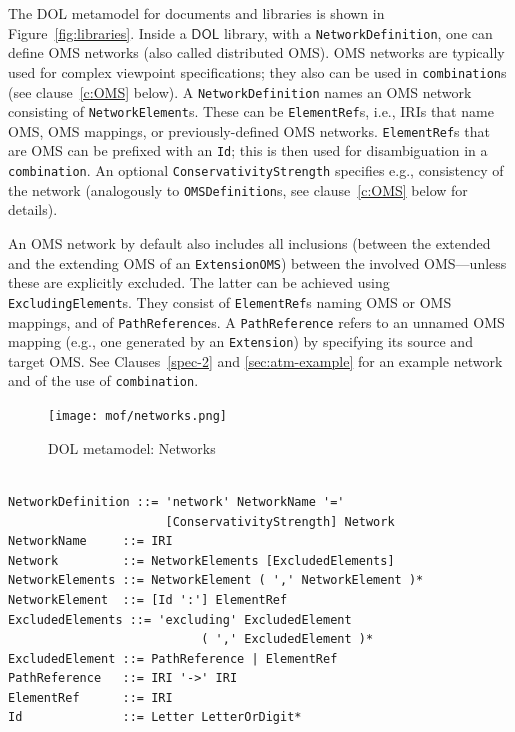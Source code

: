 \documentclass[10pt, a4paper]{isov2}
\newcommand*{\syntax}[1]{\texttt{#1}}
\newcommand*{\DOL}{\ensuremath{\mathsf{DOL}}\xspace}
\begin{document}
\label{c:networks}


The DOL metamodel for documents and libraries is shown in Figure~\ref{fig:libraries}.
Inside a \DOL library, with a \syntax{NetworkDefinition}, one can
define OMS networks (also called distributed OMS). OMS networks are
typically used for complex viewpoint specifications; they also can be
used in \syntax{combination}s (see clause~\ref{c:OMS} below). A
\syntax{NetworkDefinition} names an OMS network consisting of
\syntax{NetworkElement}s. These can be \syntax{ElementRef}s,
i.e., IRIs that name OMS, OMS mappings, or previously-defined OMS
networks. \syntax{ElementRef}s that are OMS can be prefixed with an
\syntax{Id}; this is then used for disambiguation in a
\syntax{combination}.  An optional \syntax{ConservativityStrength}
specifies e.g., consistency of the network (analogously to
\syntax{OMSDefinition}s, see clause~\ref{c:OMS} below for details).


An OMS network by default also includes all inclusions (between
the extended and the extending OMS of an \syntax{ExtensionOMS})
between the involved OMS---unless these are explicitly excluded.
The latter can be achieved using \syntax{Exclud\-ingElement}s.
They consist of \syntax{ElementRef}s naming OMS or OMS mappings,
and of \syntax{PathReference}s. A \syntax{PathReference} refers
to an unnamed OMS mapping (e.g., one generated by an \syntax{Extension})
by specifying its source and target OMS. See Clauses~\ref{spec-2} and \ref{sec:atm-example}
for an example network and of the use of \syntax{combination}.

\medskip
\begin{figure}
  \centering
    \texttt{[image: mof/networks.png]}
  \caption{DOL metamodel: Networks}
  \label{fig:networks}
\end{figure}




\vspace{-1em}
\begin{lstlisting}[language=ebnf,escapeinside={@@},morecomment={[l]{\%\%\ }}]

NetworkDefinition ::= 'network' NetworkName '='
                      [ConservativityStrength] Network
NetworkName     ::= IRI
Network         ::= NetworkElements [ExcludedElements]
NetworkElements ::= NetworkElement ( ',' NetworkElement )*
NetworkElement  ::= [Id ':'] ElementRef
ExcludedElements ::= 'excluding' ExcludedElement 
                           ( ',' ExcludedElement )*
ExcludedElement ::= PathReference | ElementRef
PathReference   ::= IRI '->' IRI
ElementRef      ::= IRI
Id              ::= Letter LetterOrDigit*
\end{lstlisting}
\end{document}
